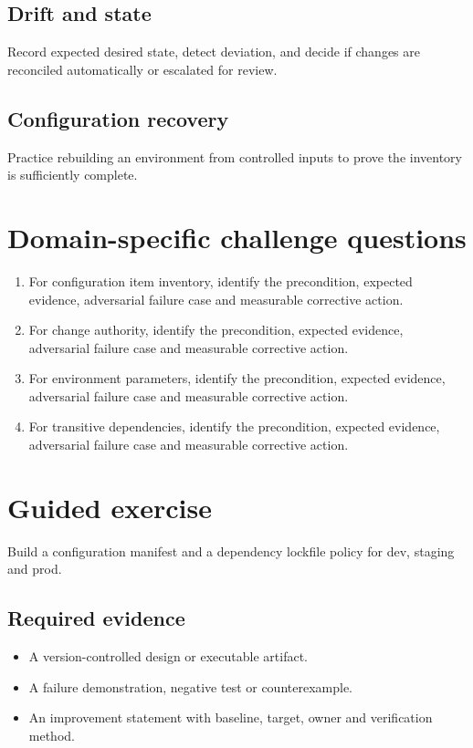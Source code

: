 \documentclass[10pt,letterpaper]{article}
\begin{document}
\subsection{Drift and state}
Record expected desired state, detect deviation, and decide if changes are reconciled automatically or escalated for review.

\subsection{Configuration recovery}
Practice rebuilding an environment from controlled inputs to prove the inventory is sufficiently complete.

\section{Domain-specific challenge questions}
\begin{enumerate}
\item For configuration item inventory, identify the precondition, expected evidence, adversarial failure case and measurable corrective action.
\item For change authority, identify the precondition, expected evidence, adversarial failure case and measurable corrective action.
\item For environment parameters, identify the precondition, expected evidence, adversarial failure case and measurable corrective action.
\item For transitive dependencies, identify the precondition, expected evidence, adversarial failure case and measurable corrective action.
\end{enumerate}
\section{Guided exercise}
Build a configuration manifest and a dependency lockfile policy for dev, staging and prod.

\subsection{Required evidence}
\begin{itemize}
\item A version-controlled design or executable artifact.
\item A failure demonstration, negative test or counterexample.
\item An improvement statement with baseline, target, owner and verification method.
\end{itemize}
\end{document}
